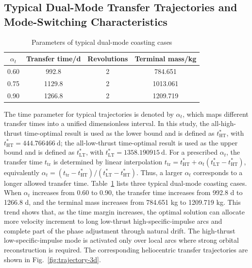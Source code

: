 \documentclass{IEEEtaes}
\begin{document}
\subsection{Typical Dual-Mode Transfer Trajectories and Mode-Switching Characteristics}

\begin{table}[!t]
\caption{Parameters of typical dual-mode coasting cases}
\label{tab:typical-cases}
\centering
\footnotesize
\begin{tabular}{cccc}
\toprule
$\alpha_t$ & Transfer time/d & Revolutions & Terminal mass/kg \\
\midrule
0.60 & 992.8 & 2 & 784.651 \\
0.75 & 1129.8 & 2 & 1013.061 \\
0.90 & 1266.8 & 2 & 1209.719 \\
\bottomrule
\end{tabular}
\end{table}

The time parameter for typical trajectories is denoted by $\alpha_t$, which maps different transfer times into a unified dimensionless interval. In this study, the all-high-thrust time-optimal result is used as the lower bound and is defined as $t_{\mathrm{HT}}^{\ast}$, with $t_{\mathrm{HT}}^{\ast}=444.766466~\mathrm{d}$; the all-low-thrust time-optimal result is used as the upper bound and is defined as $t_{\mathrm{LT}}^{\ast}$, with $t_{\mathrm{LT}}^{\ast}=1358.190915~\mathrm{d}$. For a prescribed $\alpha_t$, the transfer time $t_{\mathrm{tr}}$ is determined by linear interpolation $t_{\mathrm{tr}}=t_{\mathrm{HT}}^{\ast}+\alpha_t(t_{\mathrm{LT}}^{\ast}-t_{\mathrm{HT}}^{\ast})$, equivalently $\alpha_t=(t_{\mathrm{tr}}-t_{\mathrm{HT}}^{\ast})/(t_{\mathrm{LT}}^{\ast}-t_{\mathrm{HT}}^{\ast})$. Thus, a larger $\alpha_t$ corresponds to a longer allowed transfer time. Table~\ref{tab:typical-cases} lists three typical dual-mode coasting cases. When $\alpha_t$ increases from 0.60 to 0.90, the transfer time increases from 992.8 d to 1266.8 d, and the terminal mass increases from 784.651 kg to 1209.719 kg. This trend shows that, as the time margin increases, the optimal solution can allocate more velocity increment to long low-thrust high-specific-impulse arcs and complete part of the phase adjustment through natural drift. The high-thrust low-specific-impulse mode is activated only over local arcs where strong orbital reconstruction is required. The corresponding heliocentric transfer trajectories are shown in Fig.~\ref{fig:trajectory-3d}.
\end{document}
